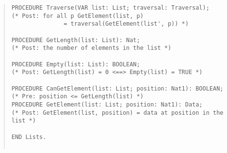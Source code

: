 \begin{quote}
\begin{verbatim}
PROCEDURE Traverse(VAR list: List; traversal: Traversal);
(* Post: for all p GetElement(list, p) 
               = traversal(GetElement(list', p)) *)
     
PROCEDURE GetLength(list: List): Nat;
(* Post: the number of elements in the list *)

PROCEDURE Empty(list: List): BOOLEAN;
(* Post: GetLength(list) = 0 <==> Empty(list) = TRUE *)     

PROCEDURE CanGetElement(list: List; position: Nat1): BOOLEAN;
(* Pre: position <= GetLength(list) *)
PROCEDURE GetElement(list: List; position: Nat1): Data;
(* Post: GetElement(list, position) = data at position in the list *)

END Lists.


\end{verbatim}
\end{quote}

